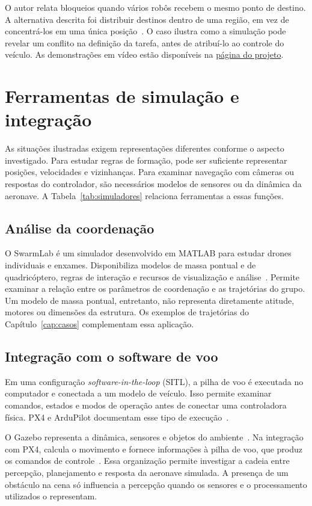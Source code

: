 O autor relata bloqueios quando vários robôs recebem o mesmo ponto de destino. A alternativa descrita foi distribuir destinos dentro de uma região, em vez de concentrá-los em uma única posição~\cite{jiahaoswarm}. O caso ilustra como a simulação pode revelar um conflito na definição da tarefa, antes de atribuí-lo ao controle do veículo. As demonstrações em vídeo estão disponíveis na \href{https://www.jiahaoz.com/swarm-simulation}{página do projeto}.

\FloatBarrier
\section{Ferramentas de simulação e integração}
As situações ilustradas exigem representações diferentes conforme o aspecto investigado. Para estudar regras de formação, pode ser suficiente representar posições, velocidades e vizinhanças. Para examinar navegação com câmeras ou respostas do controlador, são necessários modelos de sensores ou da dinâmica da aeronave. A Tabela~\ref{tab:simuladores} relaciona ferramentas a essas funções.

\subsection{Análise da coordenação}
O SwarmLab é um simulador desenvolvido em MATLAB para estudar drones individuais e enxames. Disponibiliza modelos de massa pontual e de quadricóptero, regras de interação e recursos de visualização e análise~\cite{swarmlab,swarmrepo}. Permite examinar a relação entre os parâmetros de coordenação e as trajetórias do grupo. Um modelo de massa pontual, entretanto, não representa diretamente atitude, motores ou dimensões da estrutura. Os exemplos de trajetórias do Capítulo~\ref{cap:casos} complementam essa aplicação.

\subsection{Integração com o software de voo}
Em uma configuração \emph{software-in-the-loop} (SITL), a pilha de voo é executada no computador e conectada a um modelo de veículo. Isso permite examinar comandos, estados e modos de operação antes de conectar uma controladora física. PX4 e ArduPilot documentam esse tipo de execução~\cite{px4sim,ardusitl}.

O Gazebo representa a dinâmica, sensores e objetos do ambiente~\cite{gazebo}. Na integração com PX4, calcula o movimento e fornece informações à pilha de voo, que produz os comandos de controle~\cite{px4gazebo}. Essa organização permite investigar a cadeia entre percepção, planejamento e resposta da aeronave simulada. A presença de um obstáculo na cena só influencia a percepção quando os sensores e o processamento utilizados o representam.

